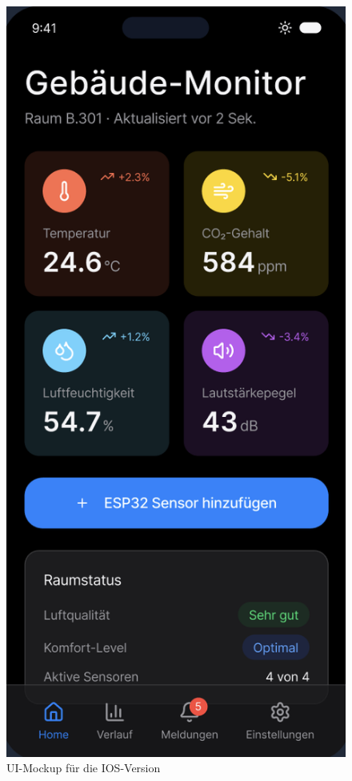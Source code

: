 \documentclass{article}
\begin{document}
\begin{figure}[H]
  \centering
  \includegraphics[width=\textwidth, height=0.9\textheight, keepaspectratio]{UI_Mockup_IOS.png}
  \caption{UI-Mockup für die IOS-Version}
  \label{fig:ui-mockup-ios}
\end{figure}
\end{document}
